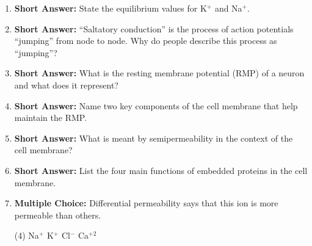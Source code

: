 \begin{enumerate}[label=\textbf{Q2.3.\arabic*}]
      \item \textbf{Short Answer:} State the equilibrium values for K\(^{+}\) and Na\(^{+}\). \\

      \item \textbf{Short Answer:} ``Saltatory conduction'' is the process of action potentials ``jumping'' from node to node. Why do people describe this process as ``jumping''? \\

      \item \textbf{Short Answer:} What is the resting membrane potential (RMP) of a neuron and what does it represent? \\ 

      \item \textbf{Short Answer:} Name two key components of the cell membrane that help maintain the RMP. \\

      \item \textbf{Short Answer:} What is meant by semipermeability in the context of the cell membrane? \\

      \item \textbf{Short Answer:} List the four main functions of embedded proteins in the cell membrane. \\

      \item \textbf{Multiple Choice:} Differential permeability says that this ion is more permeable than others. 
      \begin{tasks}[label=(\Alph*), label-width=1.5em, item-indent=1.7em](4)
            \task Na\(^{+}\)
            \task K\(^{+}\)
            \task Cl\(^{-}\)
            \task Ca\(^{+2}\)
      \end{tasks}


\end{enumerate}
